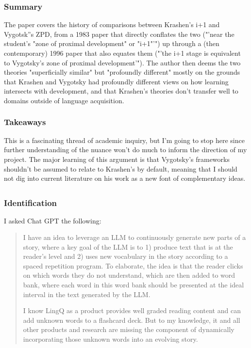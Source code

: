 \documentclass[
	letterpaper, %
]{jdf}
\begin{document}
\subsubsection{Summary}
The paper covers the history of comparisons between Krashen's i+1 and Vygotsk''s ZPD, from a 1983 paper that directly conflates the two ("'near the student's "zone of proximal development" or "i+1"'") up through a (then contemporary) 1996 paper that also equates them ("'the i+1 stage is equivalent to Vygotsky's zone of proximal development'"). The author then deems the two theories "superficially similar" but "profoundly different" mostly on the grounds that Krashen and Vygotsky had profoundly different views on how learning intersects with development, and that Krashen's theories don't transfer well to domains outside of language acquisition.

\subsubsection{Takeaways}
This is a fascinating thread of academic inquiry, but I'm going to stop here since further understanding of the nuance won't do much to inform the direction of my project. The major learning of this argument is that Vygotsky's frameworks shouldn't be assumed to relate to Krashen's by default, meaning that I should not dig into current literature on his work as a new font of complementary ideas.

\subsection{}
\subsubsection{Identification}
I asked Chat GPT the following:

\blockquote{I have an idea to leverage an LLM to continuously generate new parts of a story, where a key goal of the LLM is to 1) produce text that is at the reader's level and 2) uses new vocabulary in the story according to a spaced repetition program. To elaborate, the idea is that the reader clicks on which words they do not understand, which are then added to word bank, where each word in this word bank should be presented at the ideal interval in the text generated by the LLM.

I know LingQ as a product provides well graded reading content and can add unknown words to a flashcard deck. But to my knowledge, it and all other products and research are missing the component of dynamically incorporating those unknown words into an evolving story.}
\end{document}

